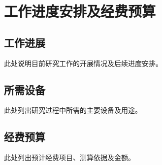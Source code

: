 \chapter{工作进度安排及经费预算}

\section{工作进展}
此处说明目前研究工作的开展情况及后续进度安排。

\section{所需设备}
此处列出研究过程中所需的主要设备及用途。

\section{经费预算}
此处列出预计经费项目、测算依据及金额。
